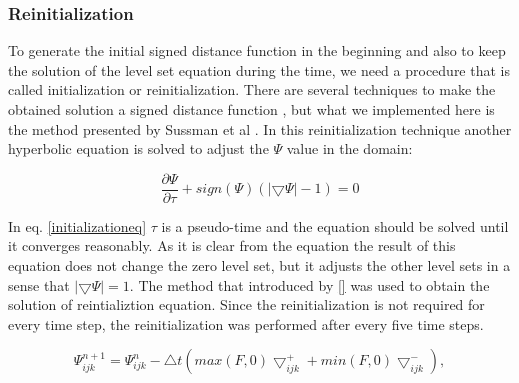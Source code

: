 \documentclass[letterpaper,10pt]{article}
\begin{document}
% 
% 
         

\subsubsection{Reinitialization} \label{reinitialization}

To generate the initial signed distance function in the beginning and also to keep the solution of the level set equation during 
the time, we need a procedure that is called initialization or reinitialization. There are several techniques to make the obtained 
solution a signed distance function \cite{levelsetbook}, but what we implemented here is the method presented by 
Sussman et al \cite{Sussman}. In this reinitialization technique another hyperbolic equation is solved to adjust the $\varPsi$ value 
in the domain:

\begin{equation}\label{initializationeq}
 \frac{\partial \varPsi}{\partial \tau} + sign(\varPsi) (|\bigtriangledown \varPsi| - 1)= 0 
\end{equation}

In eq. \eqref{initializationeq} $\tau$ is a pseudo-time and the equation should be solved until it converges reasonably. 
As it is clear from the equation the result of this equation does not change the zero level set, but it adjusts the other level sets 
in a sense that $|\bigtriangledown \varPsi|=1$.
The method that introduced by \ref{} was used to obtain the solution of reintializtion equation. Since the reinitialization 
is not required for every time step, the reinitialization was performed after every five time steps.

\begin{equation}
 \varPsi_{ijk}^{n+1}=\varPsi_{ijk}^{n}-\bigtriangleup t \left(max(F,0)\bigtriangledown_{ijk}^{+}+min(F,0)\bigtriangledown_{ijk}^{-} \right),
\end{equation}
\end{document}
